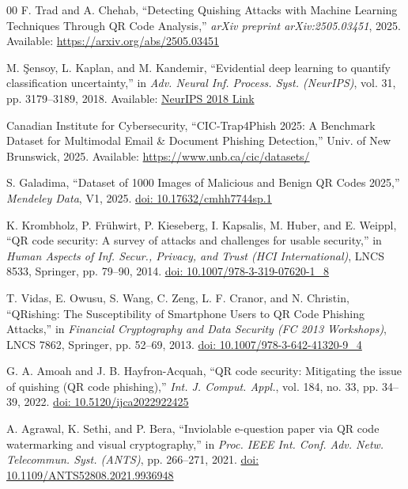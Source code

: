 \documentclass[conference]{IEEEtran}
\begin{document}
\begin{thebibliography}{00}
 F. Trad and A. Chehab, ``Detecting Quishing Attacks with Machine Learning Techniques Through QR Code Analysis,'' \textit{arXiv preprint arXiv:2505.03451}, 2025. Available: \href{https://arxiv.org/abs/2505.03451}{https://arxiv.org/abs/2505.03451}

 M. \c{S}ensoy, L. Kaplan, and M. Kandemir, ``Evidential deep learning to quantify classification uncertainty,'' in \textit{Adv. Neural Inf. Process. Syst. (NeurIPS)}, vol. 31, pp. 3179--3189, 2018. Available: \href{https://proceedings.neurips.cc/paper/2018/hash/a981f2b708044d6fb4a71a1460642777-Abstract.html}{NeurIPS 2018 Link}

 Canadian Institute for Cybersecurity, ``CIC-Trap4Phish 2025: A Benchmark Dataset for Multimodal Email \& Document Phishing Detection,'' Univ. of New Brunswick, 2025. Available: \href{https://www.unb.ca/cic/datasets/}{https://www.unb.ca/cic/datasets/}

 S. Galadima, ``Dataset of 1000 Images of Malicious and Benign QR Codes 2025,'' \textit{Mendeley Data}, V1, 2025. \href{https://doi.org/10.17632/cmhh7744sp.1}{doi: 10.17632/cmhh7744sp.1}

 K. Krombholz, P. Fr{\"u}hwirt, P. Kieseberg, I. Kapsalis, M. Huber, and E. Weippl, ``QR code security: A survey of attacks and challenges for usable security,'' in \textit{Human Aspects of Inf. Secur., Privacy, and Trust (HCI International)}, LNCS 8533, Springer, pp. 79--90, 2014. \href{https://doi.org/10.1007/978-3-319-07620-1_8}{doi: 10.1007/978-3-319-07620-1\_8}

 T. Vidas, E. Owusu, S. Wang, C. Zeng, L. F. Cranor, and N. Christin, ``QRishing: The Susceptibility of Smartphone Users to QR Code Phishing Attacks,'' in \textit{Financial Cryptography and Data Security (FC 2013 Workshops)}, LNCS 7862, Springer, pp. 52--69, 2013. \href{https://doi.org/10.1007/978-3-642-41320-9_4}{doi: 10.1007/978-3-642-41320-9\_4}

 G. A. Amoah and J. B. Hayfron-Acquah, ``QR code security: Mitigating the issue of quishing (QR code phishing),'' \textit{Int. J. Comput. Appl.}, vol. 184, no. 33, pp. 34--39, 2022. \href{https://doi.org/10.5120/ijca2022922425}{doi: 10.5120/ijca2022922425}

 A. Agrawal, K. Sethi, and P. Bera, ``Inviolable e-question paper via QR code watermarking and visual cryptography,'' in \textit{Proc. IEEE Int. Conf. Adv. Netw. Telecommun. Syst. (ANTS)}, pp. 266--271, 2021. \href{https://doi.org/10.1109/ANTS52808.2021.9936948}{doi: 10.1109/ANTS52808.2021.9936948}


\end{thebibliography}
\end{document}

